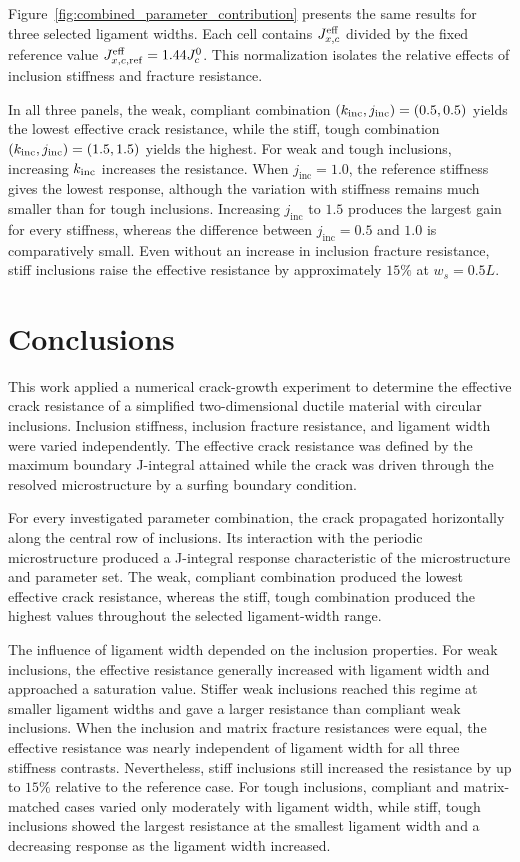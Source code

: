 \documentclass[pamm,a4paper,fleqn]{w-art}
\newcommand{\Kinc}{k_{\rm inc}}
\newcommand{\Jinc}{j_{\text{inc}}}
\newcommand{\Jeff}{J_{x,c}^{\rm eff}}
\begin{document}
Figure~\ref{fig:combined_parameter_contribution} presents the same
results for three selected ligament widths. Each cell contains
\(\Jeff\) divided by the fixed reference value
\(J_{x,c,\rm ref}^{\rm eff}=1.44J_c^0\). This normalization
isolates the relative effects of inclusion stiffness and fracture
resistance.

In all three panels, the weak, compliant combination
\((\Kinc,\Jinc)=(0.5,0.5)\) yields the lowest effective crack
resistance, while the stiff, tough combination
\((\Kinc,\Jinc)=(1.5,1.5)\) yields the highest. For weak and tough
inclusions, increasing \(\Kinc\) increases the resistance. When
\(\Jinc=1.0\), the reference stiffness gives the lowest response,
although the variation with stiffness remains much smaller than for
tough inclusions. Increasing \(\Jinc\) to \(1.5\) produces the
largest gain for every stiffness, whereas the difference between
\(\Jinc=0.5\) and \(1.0\) is comparatively small. Even without an
increase in inclusion fracture resistance, stiff inclusions raise
the effective resistance by approximately \(15\%\) at \(w_s=0.5L\).


\section{Conclusions}\label{sec:conclusions}

This work applied a numerical crack-growth experiment to determine
the effective crack resistance of a simplified two-dimensional
ductile material with circular inclusions. Inclusion stiffness,
inclusion fracture resistance, and ligament width were varied
independently. The effective crack resistance was defined by the
maximum boundary J-integral attained while the crack was driven
through the resolved microstructure by a surfing boundary condition.

For every investigated parameter combination, the crack propagated
horizontally along the central row of inclusions. Its interaction
with the periodic microstructure produced a J-integral
response characteristic of the microstructure and parameter set. The
weak, compliant combination produced the lowest effective crack
resistance, whereas the stiff, tough combination produced the highest
values throughout the selected ligament-width range.

The influence of ligament width depended on the inclusion
properties. For weak inclusions, the effective resistance generally
increased with ligament width and approached a saturation value.
Stiffer weak inclusions reached this regime at smaller ligament
widths and gave a larger resistance than compliant weak inclusions.
When the inclusion and matrix fracture resistances were equal, the
effective resistance was nearly independent of ligament width for
all three stiffness contrasts. Nevertheless, stiff inclusions still
increased the resistance by up to \(15\%\) relative to the reference
case. For tough inclusions, compliant and matrix-matched cases varied
only moderately with ligament width, while stiff, tough inclusions
showed the largest resistance at the smallest ligament width and a
decreasing response as the ligament width increased.
\end{document}
